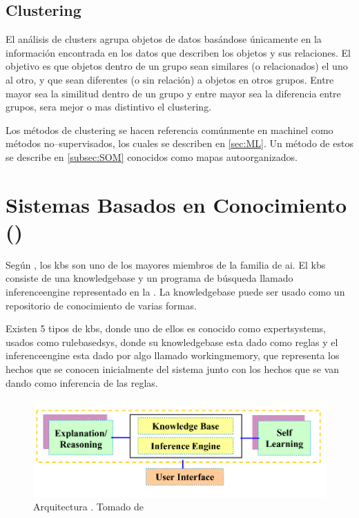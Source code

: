 \subsection{Clustering} \label{subsec:clustering}
El análisis de clusters agrupa objetos de datos basándose únicamente en la información encontrada en los datos que describen los objetos y sus relaciones. El objetivo es que objetos dentro de un grupo sean similares (o relacionados) el uno al otro, y que sean diferentes (o sin relación) a objetos en otros grupos. Entre mayor sea la similitud dentro de un grupo y entre mayor sea la diferencia entre grupos, sera mejor o mas distintivo el clustering.

Los métodos de clustering se hacen referencia comúnmente en \gls{machinel} como métodos no--supervisados, los cuales se describen en \ref{sec:ML}. Un método de estos se describe en \ref{subsec:SOM} conocidos como mapas autoorganizados.


\section{Sistemas Basados en Conocimiento ()} \label{sec:KBS}
Según \cite{sajja2010knowledge}, los \gls{kbs} son uno de los mayores miembros de la familia de \gls{ai}. El \gls{kbs} consiste de una \gls{knowledgebase} y un programa de búsqueda llamado \gls{inferenceengine} representado en la . La \gls{knowledgebase} puede ser usado como un repositorio de conocimiento de varias formas.

Existen 5 tipos de \gls{kbs}, donde uno de ellos es conocido como \gls{expertsystems}, usados como \gls{rulebasedsys}, donde su \gls{knowledgebase} esta dado como reglas y el \gls{inferenceengine} esta dado por algo llamado \gls{workingmemory}, que representa los hechos que se conocen inicialmente del sistema junto con los hechos que se van dando como inferencia de las reglas.

\begin{figure}[H]
\centering
\includegraphics[scale=0.4]{Figures/kbs-architecture.png}
\decoRule
\caption[Arquitectura ]{Arquitectura . Tomado de \cite{sajja2010knowledge}}
\label{fig:kbs-arch}
\end{figure}

